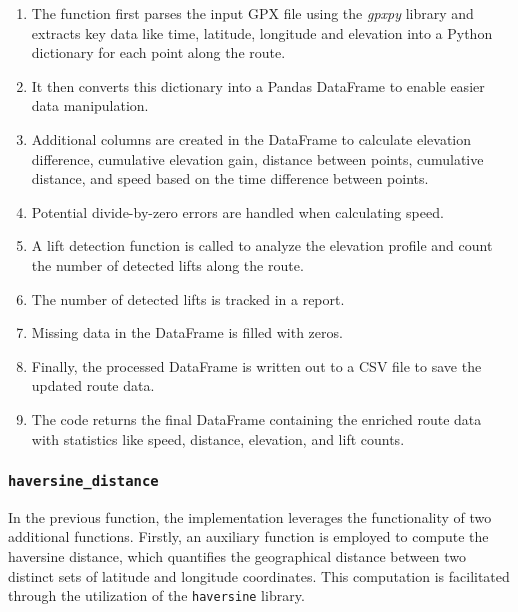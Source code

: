 \begin{enumerate}
    \item The function first parses the input GPX file using the \textit{gpxpy} library and extracts key data like time, latitude, longitude and elevation into a Python dictionary for each point along the route.
    
    \item It then converts this dictionary into a Pandas DataFrame to enable easier data manipulation.
    
    \item Additional columns are created in the DataFrame to calculate elevation difference, cumulative elevation gain, distance between points, cumulative distance, and speed based on the time difference between points.
    
    \item Potential divide-by-zero errors are handled when calculating speed.
    
    \item A lift detection function is called to analyze the elevation profile and count the number of detected lifts along the route.
    
    \item The number of detected lifts is tracked in a report.
    
    \item Missing data in the DataFrame is filled with zeros.
    
    \item Finally, the processed DataFrame is written out to a CSV file to save the updated route data.
    
    \item The code returns the final DataFrame containing the enriched route data with statistics like speed, distance, elevation, and lift counts.
\end{enumerate}


\subsubsection{\texttt{haversine\_distance}}

In the previous function, the implementation leverages the functionality of two additional functions. Firstly, an auxiliary function is employed to compute the haversine distance, which quantifies the geographical distance between two distinct sets of latitude and longitude coordinates. This computation is facilitated through the utilization of the \texttt{haversine} library. 

